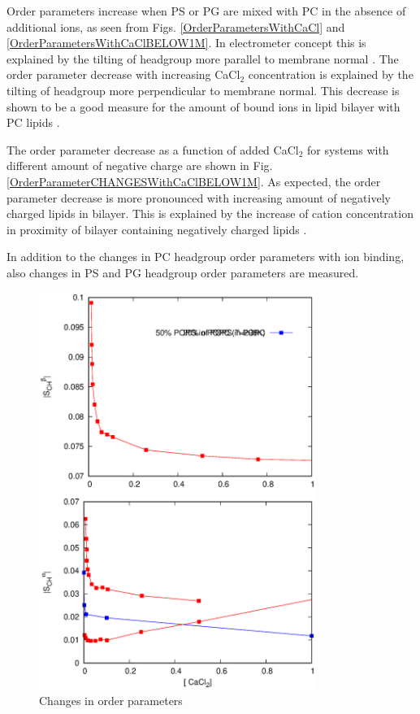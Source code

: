 \documentclass[aps,prl,superscriptaddress,twocolumn]{revtex4}
\begin{document}
Order parameters increase when PS or PG are mixed with PC 
in the absence of additional ions, as seen from Figs. 
\ref{OrderParametersWithCaCl} and \ref{OrderParametersWithCaClBELOW1M}.
In electrometer concept this is explained by the tilting of
headgroup more parallel to membrane normal \cite{??}.
The order parameter decrease with increasing CaCl$_2$ concentration 
is explained by the tilting of headgroup more perpendicular
to membrane normal. This decrease is shown to be a good measure
for the amount of bound ions in lipid bilayer with PC lipids \cite{??,catte16}.

The order parameter decrease as a function of added CaCl$_2$
for systems with different amount of negative charge are shown 
in Fig. \ref{OrderParameterCHANGESWithCaClBELOW1M}.
As expected, the order parameter decrease is more 
pronounced with increasing amount of negatively charged lipids in
bilayer. This is explained by the increase of cation concentration
in proximity of bilayer containing negatively charged lipids \cite{??}.

In addition to the changes in PC headgroup order parameters with 
ion binding, also changes in PS and PG headgroup order parameters
are measured.

\begin{figure}[]
  \centering
  \includegraphics[width=9.0cm]{../Figs/PSPGwithCaCl.eps}
  \caption{\label{PSPGchangesWITHCaCl}
    Changes in order parameters
  }
\end{figure}
\end{document}
